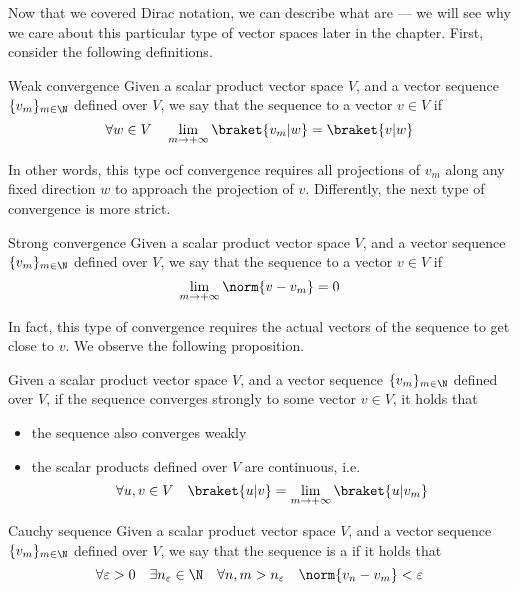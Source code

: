 \documentclass[a4paper, 12pt]{report}
\begin{document}
Now that we covered Dirac notation, we can describe what are  --- we will see why we care about this particular type of vector spaces later in the chapter. First, consider the following definitions.

\begin{frameddefn}{Weak convergence}
	Given a scalar product vector space $V$, and a vector sequence $\{v_m\}_{m \in \N}$ defined over $V$, we say that the sequence  to a vector $v \in V$ if $$\forall w \in V \quad \lim_{m \to + \infty}{\braket{v_m|w}} = \braket{v|w}$$
\end{frameddefn}

In other words, this type ocf convergence requires all projections of $v_m$ along any fixed direction $w$ to approach the projection of $v$. Differently, the next type of convergence is more strict.

\begin{frameddefn}{Strong convergence}
	Given a scalar product vector space $V$, and a vector sequence $\{v_m\}_{m \in \N}$ defined over $V$, we say that the sequence  to a vector $v \in V$ if $$\lim_{m \to + \infty}{\norm{v - v_m}} = 0$$
\end{frameddefn}

In fact, this type of convergence requires the actual vectors of the sequence to get close  to $v$. We observe the following proposition.

\begin{framedprop}{}
	Given a scalar product vector space $V$, and a vector sequence $\{v_m\}_{m \in \N}$ defined over $V$, if the sequence converges strongly to some vector $v \in V$, it holds that

	\begin{itemize}
		\item the sequence also converges weakly
		\item the scalar products defined over $V$ are continuous, i.e. $$\forall u, v \in V \quad \braket{u|v} = \lim_{m \to + \infty}{\braket{u|v_m}}$$
	\end{itemize}
\end{framedprop}

\begin{frameddefn}{Cauchy sequence}
	Given a scalar product vector space $V$, and a vector sequence $\{v_m\}_{m \in \N}$ defined over $V$, we say that the sequence is a  if it holds that $$\forall \varepsilon > 0 \quad \exists n_\varepsilon \in \N \quad \forall n, m > n_\varepsilon \quad \norm{v_n - v_m} < \varepsilon$$
\end{frameddefn}
\end{document}
